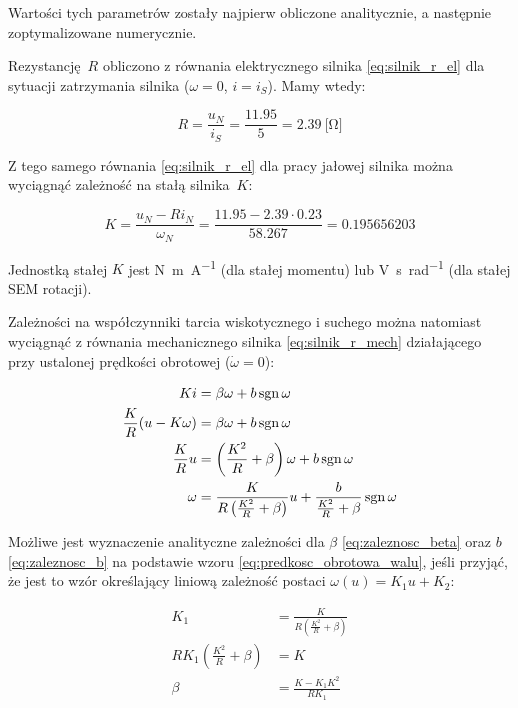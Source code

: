 Wartości tych parametrów zostały najpierw obliczone analitycznie, a następnie zoptymalizowane numerycznie.

Rezystancję $R$ obliczono z równania elektrycznego silnika \eqref{eq:silnik_r_el} dla sytuacji zatrzymania silnika ($\omega = 0$, $i = i_S$). Mamy wtedy:

\begin{equation}
    R = \frac{u_N}{i_S} = \frac{\num{11,95}}{\num{5}} = \SI{2,39}{[\ohm]}
\end{equation}

Z tego samego równania \eqref{eq:silnik_r_el} dla pracy jałowej silnika można wyciągnąć zależność na stałą silnika~$K$:

\begin{equation}
    K = \frac{u_N - R i_N}{\omega_N} = \frac{\num{11,95} - \num{2,39} \cdot \num{0,23}}{\num{58,267}} = \num{0,195656203}
\end{equation}

Jednostką stałej $K$ jest \si{\newton\meter\per\ampere} (dla stałej momentu) lub \si{\volt\second\per\radian} (dla stałej SEM rotacji).

Zależności na współczynniki tarcia wiskotycznego i suchego można natomiast wyciągnąć z równania mechanicznego silnika \eqref{eq:silnik_r_mech} działającego przy ustalonej prędkości obrotowej ($\dot{\omega} = 0$):

\begin{align}
    K i &= \beta \omega + b \operatorname{sgn} \omega \nonumber \\
    \frac{K}{R} (u - K \omega) &= \beta \omega + b \operatorname{sgn} \omega \nonumber \\
    \frac{K}{R} u &= \left(\frac{K^2}{R} + \beta \right) \omega + b \operatorname{sgn} \omega \nonumber \\
    \omega &= \frac{K}{R \left(\frac{K^2}{R} + \beta \right)} u + \frac{b}{\frac{K^2}{R} + \beta} \operatorname{sgn} \omega \label{eq:predkosc_obrotowa_walu}
\end{align}

Możliwe jest wyznaczenie analityczne zależności dla $\beta$ \eqref{eq:zaleznosc_beta} oraz $b$ \eqref{eq:zaleznosc_b} na podstawie wzoru \eqref{eq:predkosc_obrotowa_walu}, jeśli przyjąć, że jest to wzór określający liniową zależność postaci $\omega(u) = K_1 u + K_2$:

\begin{align}
    K_1 &= \frac{K}{R \left(\frac{K^2}{R} + \beta \right)} \nonumber \\
    R K_1 \left(\frac{K^2}{R} + \beta \right) &= K \nonumber \\
    \beta &= \frac{K - K_1 K^2}{R K_1} \label{eq:zaleznosc_beta}
\end{align}

